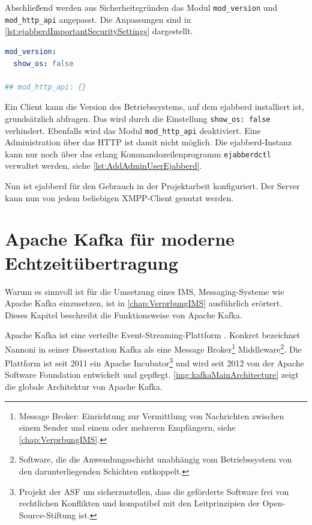 \documentclass[a4paper,titlepage,halfparskip,12pt]{scrreprt}
\begin{document}
\begin{onehalfspacing}
Abschließend werden aus Sicherheitsgründen das Modul \texttt{mod\_version} und \texttt{mod\_http\_api} angepasst. Die Anpassungen sind in \autoref{lst:ejabberdImportantSecuritySettings} dargestellt.

\begin{lstlisting}[language=yaml, caption={Konfiguration relevanter Module für die Sicherheit von ejabberd},label={lst:ejabberdImportantSecuritySettings}]
mod_version: 
  show_os: false

## mod_http_api: {}
\end{lstlisting}

Ein Client kann die Version des Betriebssystems, auf dem ejabberd installiert ist, grundsätzlich abfragen. Das wird durch die Einstellung \texttt{show\_os: false} verhindert. Ebenfalls wird das Modul \texttt{mod\_http\_api} deaktiviert. Eine Administration über das \ac{HTTP} ist damit nicht möglich. Die ejabberd-Instanz kann nur noch über das erlang Kommandozeilenprogramm \texttt{ejabberdctl} verwaltet werden, siehe \autoref{lst:AddAdminUserEjabberd}.

Nun ist ejabberd für den Gebrauch in der Projektarbeit konfiguriert. Der Server kann nun von jedem beliebigen \ac{XMPP}-Client genutzt werden.

\pagebreak

\chapter{Apache Kafka für moderne Echtzeitübertragung}
\label{chap:KafkaDescription}

Warum es sinnvoll ist für die Umsetzung eines \acs{IMS}, Messaging-Systeme wie Apache Kafka einzusetzen, ist in \autoref{chap:VerprbungIMS} ausführlich erörtert. Dieses Kapitel beschreibt die Funktionsweise von Apache Kafka. 

Apache Kafka ist eine verteilte Event-Streaming-Plattform \cite{kafkaConfluent}. Konkret bezeichnet Nannoni in seiner Dissertation \cite{nannoniDissKafka} Kafka als eine Message Broker\footnote{Message Broker: Einrichtung zur Vermittlung von Nachrichten zwischen einem Sender und einem oder mehreren Empfängern, siehe \autoref{chap:VerprbungIMS}.} Middleware\footnote{Software, die die Anwendungsschicht unabhängig vom Betriebssystem von den darunterliegenden Schichten entkoppelt.}. Die Plattform ist seit 2011 ein Apache Incubator\footnote{Projekt der \ac{ASF} um sicherzustellen, dass die geförderte Software frei von rechtlichen Konflikten und kompatibel mit den Leitprinzipien der Open-Source-Stiftung ist.\cite{asfIncubator}} und wird seit 2012 von der Apache Software Foundation entwickelt und gepflegt\cite{kafkaConfluent}. \autoref{img:kafkaMainArchitecture} zeigt die globale Architektur von Apache Kafka.


\end{onehalfspacing}
\end{document}
